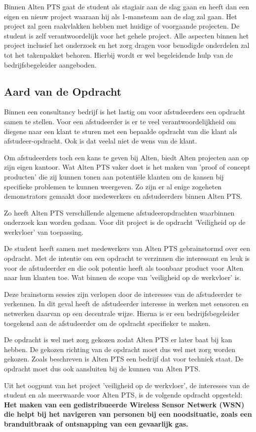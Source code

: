 \documentclass{../local}
\begin{document}
Binnen Alten PTS gaat de student als stagiair aan de slag gaan en heeft dan een eigen en nieuw project waaraan hij als 1-mansteam aan de slag zal gaan. Het project zal geen raakvlakken hebben met huidige of voorgaande projecten. De student is zelf verantwoordelijk voor het gehele project. Alle aspecten binnen het project inclusief het onderzoek en het zorg dragen voor benodigde onderdelen zal tot het takenpakket behoren. Hierbij wordt er wel begeleidende hulp van de bedrijfsbegeleider aangeboden.

\subsection{Aard van de Opdracht}

Binnen een consultancy bedrijf is het lastig om voor afstudeerders een opdracht samen te stellen. Voor een afstudeerder is er te veel verantwoordelijkheid om diegene naar een klant te sturen met een bepaalde opdracht van die klant als afstudeer-opdracht. Ook is dat veelal niet de wens van de klant. 

Om afstudeerders toch een kans te geven bij Alten, biedt Alten projecten aan op zijn eigen kantoor. Wat Alten PTS vaker doet is het maken van 'proof of concept producten' die zij kunnen tonen aan potentiële klanten om de kansen bij specifieke problemen te kunnen weergeven. Zo zijn er al enige zogeheten demonstrators gemaakt door medewerkers en afstudeerders binnen Alten PTS.

Zo heeft Alten PTS verschillende algemene afstudeeropdrachten waarbinnen onderzoek kan worden gedaan. Voor dit project is de opdracht 'Veiligheid op de werkvloer' van toepassing.

De student heeft samen met medewerkers van Alten PTS gebrainstormd over een opdracht. Met de intentie om een opdracht te verzinnen die interessant en leuk is voor de afstudeerder en die ook potentie heeft als toonbaar product voor Alten naar hun klanten toe. Wat binnen de scope van 'veiligheid op de werkvloer' is.

Deze brainstorm sessies zijn verlopen door de interesses van de afstudeerder te verkennen. In dit geval heeft de afstudeerder interesse in werken met sensoren en netwerken daarvan op een decentrale wijze. Hierna is er een bedrijfsbegeleider toegekend aan de afstudeerder om de opdracht specifieker te maken.

De opdracht is wel met zorg gekozen zodat Alten PTS er later baat bij kan hebben. De gekozen richting van de opdracht moet dus wel met zorg worden gekozen. Zoals beschreven is Alten PTS een bedrijf dat voor techniek staat. De opdracht moet dus ook aansluiten bij de kunnen van Alten PTS.

Uit het oogpunt van het project 'veiligheid op de werkvloer', de interesses van de student en als meerwaarde voor Alten PTS, is de volgende opdracht opgesteld: \\
\textbf{
Het maken van een gedistribueerde Wireless Sensor Netwerk (WSN) die helpt bij het navigeren van personen bij een noodsituatie, zoals een branduitbraak of ontsnapping van een gevaarlijk gas.
}
\end{document}
